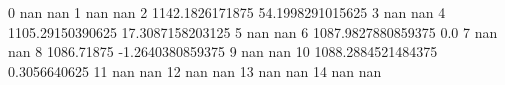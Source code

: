 0 nan nan
1 nan nan
2 1142.1826171875 54.1998291015625
3 nan nan
4 1105.29150390625 17.3087158203125
5 nan nan
6 1087.9827880859375 0.0
7 nan nan
8 1086.71875 -1.2640380859375
9 nan nan
10 1088.2884521484375 0.3056640625
11 nan nan
12 nan nan
13 nan nan
14 nan nan
